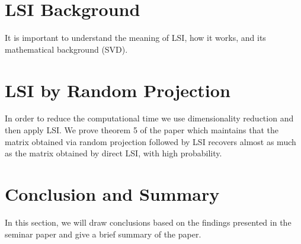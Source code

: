 \documentclass[a4paper,11pt,DIV=15]{scrartcl} %
\theoremstyle{plain}
\theoremstyle{definition}
\begin{document}
    

\section{LSI Background}
It is important to understand the meaning of LSI, how it works, and its mathematical background (SVD).

\section{LSI by Random Projection}
In order to reduce the computational time we use dimensionality reduction and then apply LSI. We prove theorem 5 of the paper which maintains that the matrix obtained via random projection followed by LSI recovers almost as
much as the matrix obtained by direct LSI, with high probability.

\section{Conclusion and Summary}
In this section, we will draw conclusions based on the findings presented in the seminar paper and give a brief summary of the paper.












\clearpage



\end{document}
